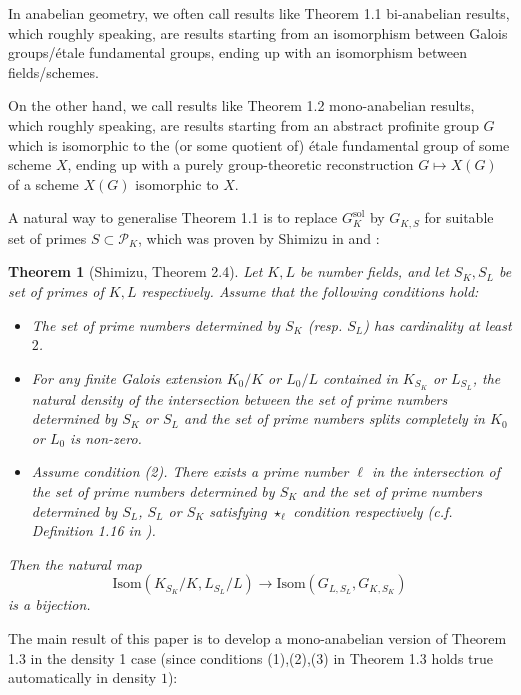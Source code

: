 \documentclass{article}
\newtheorem{thm}{Theorem}[section]
\theoremstyle{plain}
\theoremstyle{definition}
\theoremstyle{remark}
\begin{document}
In anabelian geometry, we often call results like Theorem 1.1 bi-anabelian results, which roughly speaking, are results starting from an isomorphism between Galois groups/\'etale fundamental groups, ending up with an isomorphism between fields/schemes. \par 
On the other hand, we call results like Theorem 1.2 mono-anabelian results, which roughly speaking, are results starting from an abstract profinite group $G$ which is isomorphic to the (or some quotient of) \'etale fundamental group of some scheme $X$, ending up with a purely group-theoretic reconstruction $G \mapsto X(G)$ of a scheme $X(G)$ isomorphic to $X$. \par 
A natural way to generalise Theorem 1.1 is to replace $G_K^{\text{sol}}$ by $G_{K,S}$ for suitable set of primes $S \subset \mathscr{P}_K$, which was proven by Shimizu in \cite{Shi1} and \cite{Shi2}:
\begin{thm}[Shimizu, \cite{Shi2} Theorem 2.4]
Let $K,L$ be number fields, and let $S_K,S_L$ be set of primes of $K,L$ respectively. Assume that the following conditions hold: \par 
\begin{itemize}
    \item[(1)] The set of prime numbers determined by $S_K$ (resp. $S_L$) has cardinality at least $2$.
    \item[(2)] For any finite Galois extension $K_0/K$ or $L_0/L$ contained in $K_{S_K}$ or $L_{S_L}$, the natural density of the intersection between the set of prime numbers determined by $S_K$ or $S_L$ and the set of prime numbers splits completely in $K_0$ or $L_0$ is non-zero.
    \item[(3)] Assume condition (2). There exists a prime number $\ell$ in the intersection of the set of prime numbers determined by $S_K$ and the set of prime numbers determined by $S_L$, $S_L$ or $S_K$ satisfying $\star_{\ell}$ condition respectively (c.f. Definition 1.16 in \cite{Shi1}).
\end{itemize}
Then the natural map
$$
\text{Isom}(K_{S_K}/K,L_{S_L}/L) \to \text{Isom}(G_{L,S_{L}},G_{K,S_K})
$$
is a bijection.
\end{thm}
The main result of this paper is to develop a mono-anabelian version of Theorem 1.3 in the density 1 case (since conditions (1),(2),(3) in Theorem 1.3 holds true automatically in density $1$):
\end{document}
